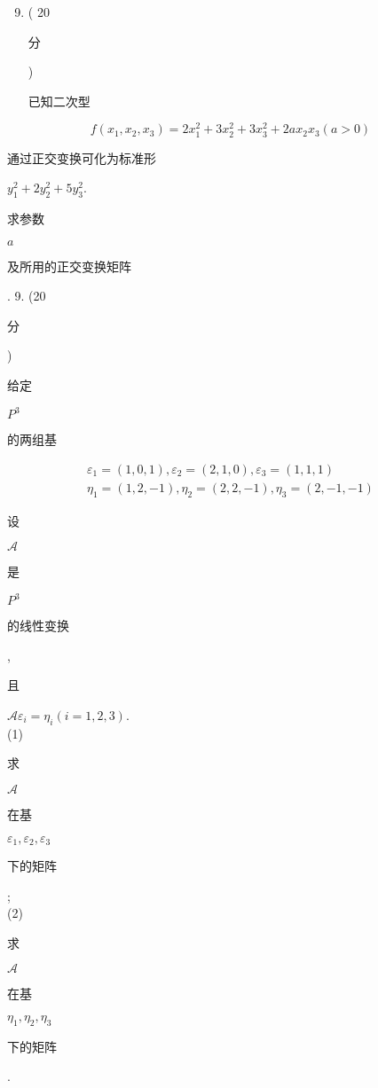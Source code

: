 \documentclass[10pt]{article}
\begin{document}
\begin{enumerate}
  \setcounter{enumi}{8}
  \item ( 20 \begin{CJK}{UTF8}{mj}分\end{CJK}) \begin{CJK}{UTF8}{mj}已知二次型\end{CJK}
\end{enumerate}
$$
f\left(x_{1}, x_{2}, x_{3}\right)=2 x_{1}^{2}+3 x_{2}^{2}+3 x_{3}^{2}+2 a x_{2} x_{3}(a>0)
$$
\begin{CJK}{UTF8}{mj}通过正交变换可化为标准形\end{CJK} $y_{1}^{2}+2 y_{2}^{2}+5 y_{3}^{2}$. \begin{CJK}{UTF8}{mj}求参数\end{CJK} $a$ \begin{CJK}{UTF8}{mj}及所用的正交变换矩阵\end{CJK}. 9. (20 \begin{CJK}{UTF8}{mj}分\end{CJK}) \begin{CJK}{UTF8}{mj}给定\end{CJK} $P^{3}$ \begin{CJK}{UTF8}{mj}的两组基\end{CJK}
$$
\begin{gathered}
\varepsilon_{1}=(1,0,1), \varepsilon_{2}=(2,1,0), \varepsilon_{3}=(1,1,1) \\
\eta_{1}=(1,2,-1), \eta_{2}=(2,2,-1), \eta_{3}=(2,-1,-1)
\end{gathered}
$$
\begin{CJK}{UTF8}{mj}设\end{CJK} $\mathscr{A}$ \begin{CJK}{UTF8}{mj}是\end{CJK} $P^{3}$ \begin{CJK}{UTF8}{mj}的线性变换\end{CJK}, \begin{CJK}{UTF8}{mj}且\end{CJK} $\mathscr{A} \varepsilon_{i}=\eta_{i}(i=1,2,3)$.\\
(1) \begin{CJK}{UTF8}{mj}求\end{CJK} $\mathscr{A}$ \begin{CJK}{UTF8}{mj}在基\end{CJK} $\varepsilon_{1}, \varepsilon_{2}, \varepsilon_{3}$ \begin{CJK}{UTF8}{mj}下的矩阵\end{CJK};\\
(2) \begin{CJK}{UTF8}{mj}求\end{CJK} $\mathscr{A}$ \begin{CJK}{UTF8}{mj}在基\end{CJK} $\eta_{1}, \eta_{2}, \eta_{3}$ \begin{CJK}{UTF8}{mj}下的矩阵\end{CJK}.
\end{document}
